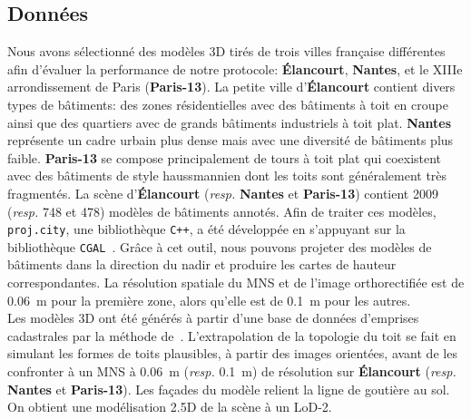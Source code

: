     \subsection*{Données}
        Nous avons sélectionné des modèles 3D tirés de trois villes française différentes afin d'évaluer la performance de notre protocole: \textbf{\'Elancourt}, \textbf{Nantes}, et le XIIIe arrondissement de Paris (\textbf{Paris-13}).
        La petite ville d'\textbf{\'Elancourt} contient divers types de bâtiments: des zones résidentielles avec des bâtiments à toit en croupe ainsi que des quartiers avec de grands bâtiments industriels à toit plat.
        \textbf{Nantes} représente un cadre urbain plus dense mais avec une diversité de bâtiments plus faible.
        \textbf{Paris-13} se compose principalement de tours à toit plat qui coexistent avec des bâtiments de style haussmannien dont les toits sont généralement très fragmentés.
        La scène d'\textbf{\'Elancourt} (\textit{resp.} \textbf{Nantes} et \textbf{Paris-13}) contient \num[locale=FR]{2009} (\textit{resp.} \num[locale=FR]{748} et \num[locale=FR]{478}) modèles de bâtiments annotés.
        Afin de traiter ces modèles, \verb!proj.city!, une bibliothèque \verb!C++!, a été développée en s'appuyant sur la bibliothèque \verb!CGAL!~\parencite{fabri2000design}.
        Grâce à cet outil, nous pouvons projeter des modèles de bâtiments dans la direction du nadir et produire les cartes de hauteur correspondantes.
        La résolution spatiale du MNS et de l'image orthorectifiée est de \SI[locale=FR]{0.06}{\m} pour la première zone, alors qu'elle est de \SI[locale=FR]{0.1}{\m} pour les autres.\\

        Les modèles 3D ont été générés à partir d'une base de données d'emprises cadastrales par la méthode de~\parencite{durupt2006automatic}.
        L'extrapolation de la topologie du toit se fait en simulant les formes de toits plausibles, à partir des images orientées, avant de les confronter à un MNS à \SI[locale=FR]{0.06}{\m} (\textit{resp.} \SI[locale=FR]{0.1}{\m}) de résolution sur \textbf{\'Elancourt} (\textit{resp.} \textbf{Nantes} et \textbf{Paris-13}).
        Les façades du modèle relient la ligne de goutière au sol.
        On obtient une modélisation 2.5D de la scène à un LoD-2.


